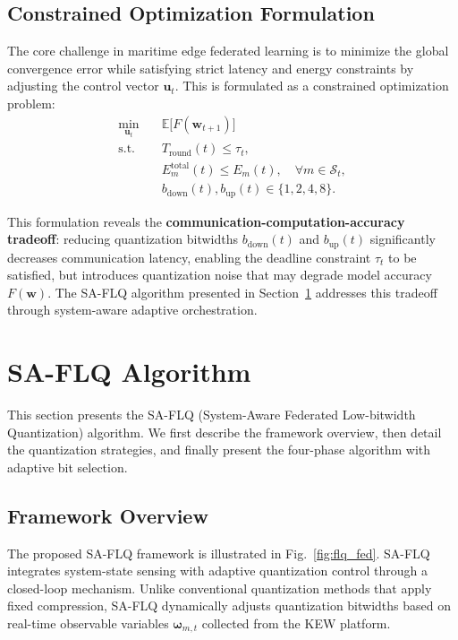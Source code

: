 \documentclass[journal]{IEEEtran}
\begin{document}
\subsection{Constrained Optimization Formulation}
The core challenge in maritime edge federated learning is to minimize the global convergence error while satisfying strict latency and energy constraints by adjusting the control vector $\mathbf{u}_t$. This is formulated as a constrained optimization problem:
\begin{align}
    \min_{\mathbf{u}_t} \quad & \mathbb{E}\big[F(\mathbf{w}_{t+1})\big] \label{eq:opt_obj} \\
    \text{s.t.} \quad 
    & T_{\text{round}}(t) \leq \tau_t, \nonumber \\
    & E^{\text{total}}_m(t) \leq E_m(t), \quad \forall m \in \mathcal{S}_t, \nonumber \\
    & b_{\text{down}}(t), b_{\text{up}}(t) \in \{1, 2, 4, 8\}. \nonumber
\end{align}

This formulation reveals the \textbf{communication-computation-accuracy tradeoff}: reducing quantization bitwidths $b_{\text{down}}(t)$ and $b_{\text{up}}(t)$ significantly decreases communication latency, enabling the deadline constraint $\tau_t$ to be satisfied, but introduces quantization noise that may degrade model accuracy $F(\mathbf{w})$. The SA-FLQ algorithm presented in Section~\ref{sec:method} addresses this tradeoff through system-aware adaptive orchestration.

\section{SA-FLQ Algorithm}
\label{sec:method}

This section presents the SA-FLQ (System-Aware Federated Low-bitwidth Quantization) algorithm. We first describe the framework overview, then detail the quantization strategies, and finally present the four-phase algorithm with adaptive bit selection.

\subsection{Framework Overview}
The proposed SA-FLQ framework is illustrated in Fig.~\ref{fig:flq_fed}. SA-FLQ integrates system-state sensing with adaptive quantization control through a closed-loop mechanism. Unlike conventional quantization methods that apply fixed compression, SA-FLQ dynamically adjusts quantization bitwidths based on real-time observable variables $\boldsymbol{\omega}_{m,t}$ collected from the KEW platform.
\end{document}

